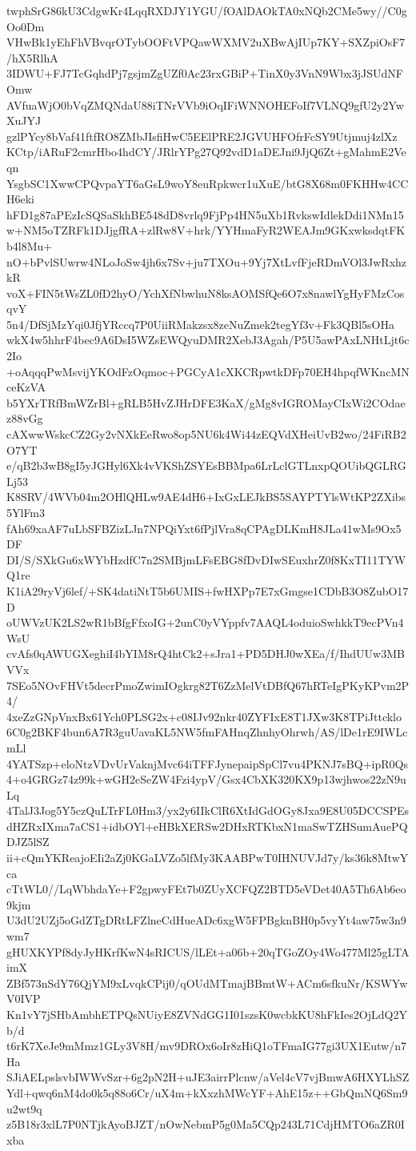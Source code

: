 twphSrG86kU3CdgwKr4LqqRXDJY1YGU/fOAlDAOkTA0xNQb2CMe5wy//C0gOo0Dm
VHwBk1yEhFhVBvqrOTybOOFtVPQawWXMV2uXBwAjIUp7KY+SXZpiOsF7/hX5RlhA
3IDWU+FJ7TcGqhdPj7gsjmZgUZf0Ac23rxGBiP+TinX0y3VnN9Wbx3jJSUdNFOmw
AVfuaWjO0bVqZMQNdaU88iTNrVVb9iOqIFiWNNOHEFoIf7VLNQ9gfU2y2YwXuJYJ
gzlPYcy8bVaf41ftfRO8ZMbJIsfiHwC5EElPRE2JGVUHFOfrFcSY9Utjmuj4zlXz
KCtp/iARuF2cmrHbo4hdCY/JRlrYPg27Q92vdD1aDEJni9JjQ6Zt+gMahmE2Veqn
YsgbSC1XwwCPQvpaYT6aGsL9woY8euRpkwcr1uXuE/btG8X68m0FKHHw4CCH6eki
hFD1g87aPEzIcSQSaSkhBE548dD8vrlq9FjPp4HN5uXb1RvkswIdlekDdi1NMn15
w+NM5oTZRFk1DJjgfRA+zlRw8V+hrk/YYHmaFyR2WEAJm9GKxwksdqtFKb4l8Mu+
nO+bPvlSUwrw4NLoJoSw4jh6x7Sv+ju7TXOu+9Yj7XtLvfFjeRDmVOl3JwRxhzkR
voX+FIN5tWsZL0fD2hyO/YchXfNbwhuN8ksAOMSfQe6O7x8nawlYgHyFMzCosqvY
5n4/DfSjMzYqi0JfjYRccq7P0UiiRMakzsx8zeNuZmek2tegYf3v+Fk3QBl5sOHa
wkX4w5hhrF4bec9A6DsI5WZsEWQyuDMR2XebJ3Agah/P5U5awPAxLNHtLjt6c2Io
+oAqqqPwMsvijYKOdFzOqmoc+PGCyA1cXKCRpwtkDFp70EH4hpqfWKncMNceKzVA
b5YXrTRfBmWZrBl+gRLB5HvZJHrDFE3KaX/gMg8vIGROMayCIxWi2COdaez88vGg
cAXwwWskcCZ2Gy2vNXkEeRwo8op5NU6k4Wi44zEQVdXHeiUvB2wo/24FiRB2O7YT
e/qB2b3wB8gI5yJGHyl6Xk4vVKShZSYEsBBMpa6LrLclGTLnxpQOUibQGLRGLj53
K8SRV/4WVb04m2OHlQHLw9AE4dH6+IxGxLEJkBS5SAYPTYlsWtKP2ZXibs5YlFm3
fAh69xaAF7uLbSFBZizLJn7NPQiYxt6fPjlVra8qCPAgDLKmH8JLa41wMs9Ox5DF
DI/S/SXkGu6xWYbHzdfC7n2SMBjmLFsEBG8fDvDIwSEuxhrZ0f8KxTI11TYWQ1re
K1iA29ryVj6lef/+SK4datiNtT5b6UMIS+fwHXPp7E7xGmgse1CDbB3O8ZubO17D
oUWVzUK2LS2wR1bBfgFfxoIG+2unC0yVYppfv7AAQL4oduioSwhkkT9ecPVn4WsU
cvAfs0qAWUGXeghiI4bYIM8rQ4htCk2+sJra1+PD5DHJ0wXEa/f/IhdUUw3MBVVx
7SEo5NOvFHVt5decrPmoZwimIOgkrg82T6ZzMelVtDBfQ67hRTeIgPKyKPvm2P4/
4xeZzGNpVnxBx61Ych0PLSG2x+c08IJv92nkr40ZYFIxE8T1JXw3K8TPiJttcklo
6C0g2BKF4bun6A7R3guUavaKL5NW5fmFAHnqZhnhyOhrwh/AS/lDe1rE9IWLcmLl
4YATSzp+eloNtzVDvUrVaknjMvc64iTFFJynepaipSpCl7vu4PKNJ7sBQ+ipR0Qs
4+o4GRGz74z99k+wGH2eSeZW4Fzi4ypV/Gsx4CbXK320KX9p13wjhwos22zN9uLq
4TalJ3Jog5Y5czQuLTrFL0Hm3/yx2y6IIkClR6XtIdGdOGy8Jxa9E8U05DCCSPEs
dHZRxIXma7aCS1+idbOYl+eHBkXERSw2DHxRTKbxN1maSwTZHSumAuePQDJZ5lSZ
ii+cQmYKReajoEIi2aZj0KGaLVZo5lfMy3KAABPwT0IHNUVJd7y/ks36k8MtwYca
cTtWL0//LqWbhdaYe+F2gpwyFEt7b0ZUyXCFQZ2BTD5eVDet40A5Th6Ab6eo9kjm
U3dU2UZj5oGdZTgDRtLFZlneCdHueADc6xgW5FPBgknBH0p5vyYt4aw75w3n9wm7
gHUXKYPf8dyJyHKrfKwN4sRICUS/lLEt+a06b+20qTGoZOy4Wo477Ml25gLTAimX
ZBf573nSdY76QjYM9xLvqkCPij0/qOUdMTmajBBmtW+ACm6sfkuNr/KSWYwV0IVP
Kn1vY7jSHbAmbhETPQsNUiyE8ZVNdGG1I01szsK0wcbkKU8hFkIes2OjLdQ2Yb/d
t6rK7XeJe9mMmz1GLy3V8H/mv9DROx6oIr8zHiQ1oTFmaIG77gi3UX1Eutw/n7Ha
SJiAELpslsvbIWWvSzr+6g2pN2H+uJE3airrPlcnw/aVel4cV7vjBmwA6HXYLhSZ
Ydl+qwq6nM4do0k5q88o6Cr/uX4m+kXxzhMWcYF+AhE15z++GbQmNQ6Sm9u2wt9q
z5B18r3xlL7P0NTjkAyoBJZT/nOwNebmP5g0Ma5CQp243L71CdjHMTO6aZR0Ixba
